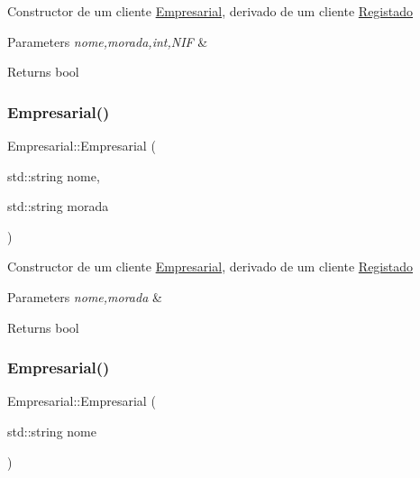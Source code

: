 Constructor de um cliente \hyperlink{class_empresarial}{Empresarial}, derivado de um cliente \hyperlink{class_registado}{Registado}


\begin{DoxyParams}{Parameters}
{\em nome,morada,int,N\+IF} & \\
\hline
\end{DoxyParams}
\begin{DoxyReturn}{Returns}
bool 
\end{DoxyReturn}
\mbox{\label{class_empresarial_a8f89fe5f36da7bf48548ff67b27e547f}} 
\subsubsection{\texorpdfstring{Empresarial()}{Empresarial()}\hspace{0.1cm}{\footnotesize\ttfamily [2/3]}}
{\footnotesize\ttfamily Empresarial\+::\+Empresarial (\begin{DoxyParamCaption}\item[{std\+::string}]{nome,  }\item[{std\+::string}]{morada }\end{DoxyParamCaption})}

Constructor de um cliente \hyperlink{class_empresarial}{Empresarial}, derivado de um cliente \hyperlink{class_registado}{Registado}


\begin{DoxyParams}{Parameters}
{\em nome,morada} & \\
\hline
\end{DoxyParams}
\begin{DoxyReturn}{Returns}
bool 
\end{DoxyReturn}
\mbox{\label{class_empresarial_a1a87eb7f12020af2c8ee8e942f3b8344}} 
\subsubsection{\texorpdfstring{Empresarial()}{Empresarial()}\hspace{0.1cm}{\footnotesize\ttfamily [3/3]}}
{\footnotesize\ttfamily Empresarial\+::\+Empresarial (\begin{DoxyParamCaption}\item[{std\+::string}]{nome }\end{DoxyParamCaption})}

